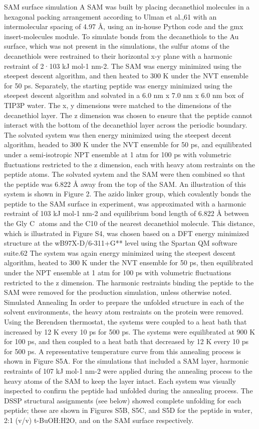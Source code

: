 SAM surface simulation
A SAM was built by placing decanethiol molecules in a hexagonal packing arrangement according to Ulman et al.,61 with an intermolecular spacing of 4.97 Å, using an in-house Python code and the gmx insert-molecules module. To simulate bonds from the decanethiols to the Au surface, which was not present in the simulations, the sulfur atoms of the decanethiols were restrained to their horizontal x-y plane with a harmonic restraint of 2·103 kJ mol-1 nm-2. The SAM was energy minimized using the steepest descent algorithm, and then heated to 300 K under the NVT ensemble for 50 ps. Separately, the starting peptide was energy minimized using the steepest descent algorithm and solvated in a 6.0 nm x 7.0 nm x 6.0 nm box of TIP3P water. The x, y dimensions were matched to the dimensions of the decanethiol layer. The z dimension was chosen to ensure that the peptide cannot interact with the bottom of the decanethiol layer across the periodic boundary. The solvated system was then energy minimized using the steepest decent algorithm, headed to 300 K under the NVT ensemble for 50 ps, and equilibrated under a semi-isotropic NPT ensemble at 1 atm for 100 ps with volumetric fluctuations restricted to the z dimension, each with heavy atom restraints on the peptide atoms.
The solvated system and the SAM were then combined so that the peptide was 6.822 Å away from the top of the SAM. An illustration of this system is shown in Figure 2. The azido linker group, which covalently bonds the peptide to the SAM surface in experiment, was approximated with a harmonic restraint of 103 kJ mol-1 nm-2 and equilibrium bond length of 6.822 Å between the Gly C atoms and the C10 of the nearest decanethiol molecule. This distance, which is illustrated in Figure S4, was chosen based on a DFT energy minimized structure at the wB97X-D/6-311+G** level using the Spartan QM software suite.62 The system was again energy minimized using the steepest descent algorithm, heated to 300 K under the NVT ensemble for 50 ps, then equilibrated under the NPT ensemble at 1 atm for 100 ps with volumetric fluctuations restricted to the z dimension. The harmonic restraints binding the peptide to the SAM were removed for the production simulation, unless otherwise noted.
Simulated Annealing
In order to prepare the unfolded structure in each of the solvent environments, the heavy atom restraints on the protein were removed. Using the Berendsen thermostat, the systems were coupled to a heat bath that increased by 12 K every 10 ps for 500 ps. The systems were equilibrated at 900 K for 100 ps, and then coupled to a heat bath that decreased by 12 K every 10 ps for 500 ps. A representative temperature curve from this annealing process is shown in Figure S5A. For the simulations that included a SAM layer, harmonic restraints of 107 kJ mol-1 nm-2 were applied during the annealing process to the heavy atoms of the SAM to keep the layer intact. Each system was visually inspected to confirm the peptide had unfolded during the annealing process. The DSSP structural assignments (see below) showed complete unfolding for each peptide; these are shown in Figures S5B, S5C, and S5D for the peptide in water, 2:1 (v/v) t-BuOH:H2O, and on the SAM surface respectively.
